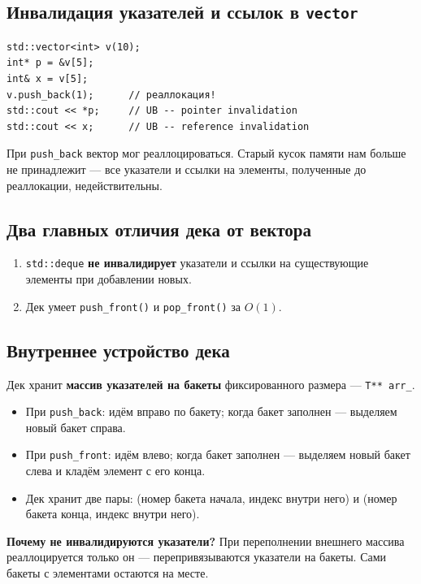 \documentclass[a4paper,12pt]{article}
\begin{document}
\subsection{Инвалидация указателей и ссылок в \texttt{vector}}

\begin{lstlisting}
std::vector<int> v(10);
int* p = &v[5];
int& x = v[5];
v.push_back(1);      // реаллокация!
std::cout << *p;     // UB -- pointer invalidation
std::cout << x;      // UB -- reference invalidation
\end{lstlisting}

При \texttt{push\_back} вектор мог реаллоцироваться. Старый кусок
памяти нам больше не принадлежит --- все указатели и ссылки на элементы,
полученные до реаллокации, недействительны.

\subsection{Два главных отличия дека от вектора}

\begin{enumerate}
    \item \texttt{std::deque} \textbf{не инвалидирует} указатели и ссылки
          на существующие элементы при добавлении новых.
    \item Дек умеет \texttt{push\_front()} и \texttt{pop\_front()} за $O(1)$.
\end{enumerate}

\subsection{Внутреннее устройство дека}

Дек хранит \textbf{массив указателей на бакеты} фиксированного размера ---
\texttt{T** arr\_}.

\begin{itemize}
    \item При \texttt{push\_back}: идём вправо по бакету; когда бакет
          заполнен --- выделяем новый бакет справа.
    \item При \texttt{push\_front}: идём влево; когда бакет заполнен ---
          выделяем новый бакет слева и кладём элемент с его конца.
    \item Дек хранит две пары: (номер бакета начала, индекс внутри него)
          и (номер бакета конца, индекс внутри него).
\end{itemize}

\textbf{Почему не инвалидируются указатели?} При переполнении внешнего
массива реаллоцируется только он --- перепривязываются указатели на бакеты.
Сами бакеты с элементами остаются на месте.
\end{document}
